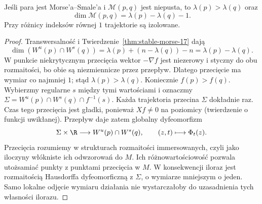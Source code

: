 \begin{stwierdzenie}
\label{prop:wymiar-ms-17}
Jeśli para jest Morse'a--Smale'a
i $\mathcal M(p,q)$ jest niepusta,
to $\lambda(p)>\lambda(q)$ oraz
\[
 \dim\mathcal M(p,q)
    =\lambda(p)-\lambda(q)-1.
\]
Przy różnicy indeksów równej $1$
trajektorie są izolowane.
\end{stwierdzenie}
\begin{proof}
Transwersalność i
Twierdzenie~\ref{thm:stable-morse-17}
dają
\[
 \dim(W^u(p)\cap W^s(q))
 =\lambda(p)+(n-\lambda(q))-n
 =\lambda(p)-\lambda(q).
\]
W punkcie niekrytycznym przecięcia
wektor $-\nabla f$ jest niezerowy
i styczny do obu rozmaitości,
bo obie są niezmiennicze
przez przepływ. Dlatego
przecięcie ma wymiar co
najmniej $1$; stąd
$\lambda(p)>\lambda(q)$.
Koniecznie $f(p)>f(q)$. Wybierzmy regularne
$s$ między tymi wartościami i oznaczmy
$\Sigma=W^u(p)\cap W^s(q)\cap f^{-1}(s)$.
Każda trajektoria przecina $\Sigma$ dokładnie raz.
Czas tego przecięcia jest gładki, ponieważ
$Xf\ne0$ na poziomicy (twierdzenie o funkcji uwikłanej).
Przepływ daje zatem globalny dyfeomorfizm
\[
 \Sigma\times\R\longrightarrow W^u(p)\cap W^s(q),
 \qquad (z,t)\longmapsto\Phi_t(z).
\]
Przecięcia rozumiemy w strukturach rozmaitości
immersowanych, czyli jako iloczyny włókniste ich
odwzorowań do $M$. Ich różnowartościowość pozwala
utożsamiać punkty z punktami przecięcia w $M$.
W konsekwencji iloraz jest rozmaitością Hausdorffa
dyfeomorficzną z $\Sigma$, o wymiarze mniejszym o jeden.
Samo lokalne odjęcie wymiaru działania nie
wystarczałoby do uzasadnienia tych własności ilorazu.
\end{proof}

